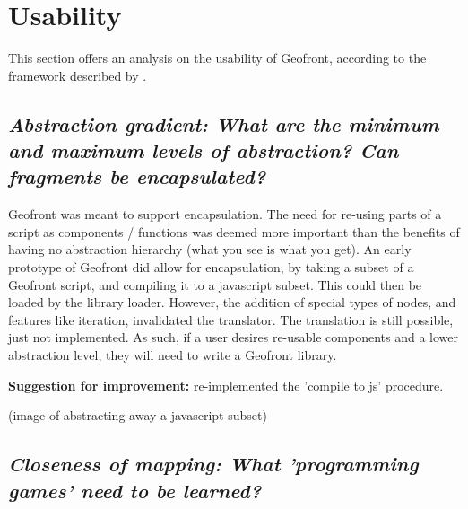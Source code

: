 



\section{Usability}
\label{sec:analyses:utilization}

This section offers an analysis on the usability of Geofront, according to the framework described by \cite[]{green_usability_1996}.



\subsection*{\emph{Abstraction gradient: What are the minimum and maximum levels of abstraction? Can fragments be encapsulated?}}

Geofront was meant to support encapsulation. 
The need for re-using parts of a script as components / functions was deemed more important than the benefits of having no abstraction hierarchy (what you see is what you get).
An early prototype of Geofront did allow for encapsulation, by taking a subset of a Geofront script, and compiling it to a javascript subset. This could then be loaded by the library loader. 
However, the addition of special types of nodes, and features like iteration, invalidated the  translator.
The translation is still possible, just not implemented.  
As such, if a user desires re-usable components and a lower abstraction level, they will need to write a Geofront library.

\textbf{Suggestion for improvement:} re-implemented the 'compile to js' procedure.

(image of abstracting away a javascript subset)



\subsection*{\emph{Closeness of mapping: What 'programming games' need to be learned?}}

